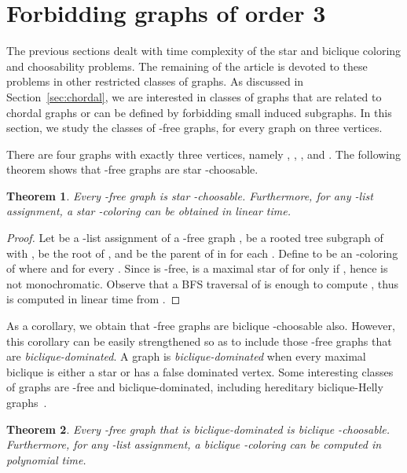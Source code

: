 \documentclass[a4paper, 11pt, oneside]{article}
\newtheorem{theorem}{Theorem}
\let\Definition=\emph
\begin{document}
\section{Forbidding graphs of order 3} 
\label{sec:small forbiddens}

The previous sections dealt with time complexity of the star and biclique coloring and choosability problems.  The remaining of the article is devoted to these problems in other restricted classes of graphs.  As discussed in Section~\ref{sec:chordal}, we are interested in classes of graphs that are related to chordal graphs or can be defined by forbidding small induced subgraphs.  In this section, we study the classes of -free graphs, for every graph  on three vertices.

There are four graphs with exactly three vertices, namely , , , and .  The following theorem shows that -free graphs are star -choosable.

\begin{theorem}\label{thm:stcol triangle-free}
  Every -free graph is star -choosable.  Furthermore, for any -list assignment, a star -coloring can be obtained in linear time.
\end{theorem}

\begin{proof}
  Let  be a -list assignment of a -free graph ,  be a rooted tree subgraph of  with ,  be the root of , and  be the parent of  in  for each .  Define  to be an -coloring of  where  and  for every .  Since  is -free,  is a maximal star of  for  only if , hence  is not monochromatic.  Observe that a BFS traversal of  is enough to compute , thus  is computed in linear time from .
\end{proof}

As a corollary, we obtain that -free graphs are biclique -choosable also.  However, this corollary can be easily strengthened so as to include those -free graphs that are \emph{biclique-dominated}.  A graph  is \Definition{biclique-dominated} when every maximal biclique is either a star or has a false dominated vertex.  Some interesting classes of graphs are -free and biclique-dominated, including hereditary biclique-Helly graphs~\cite{EguiaSoulignacDMTCS2012}.

\begin{theorem}
  Every -free graph that is biclique-dominated is biclique -choosable.  Furthermore, for any -list assignment, a biclique -coloring can be computed in polynomial time.
\end{theorem}
\end{document}
